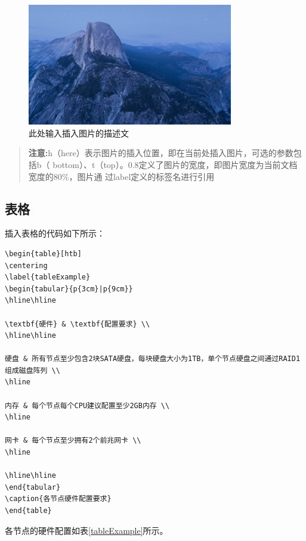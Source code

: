 \begin{figure}[h]
    \centering
    \label{example}
    \includegraphics[width=0.8\textwidth]{pic/example.png}
    \caption{此处输入插入图片的描述文}
\end{figure}

\begin{quote}
\kaishu
\textbf{注意:}h（here）表示图片的插入位置，即在当前处插入图片，可选的参数包括b（
bottom）、t（top）。0.8定义了图片的宽度，即图片宽度为当前文档宽度的80\%，图片通
过label定义的标签名进行引用
\end{quote}

\subsection{表格}
插入表格的代码如下所示：

\begin{Verbatim}[]
\begin{table}[htb]
\centering
\label{tableExample}
\begin{tabular}{p{3cm}|p{9cm}}
\hline\hline

\textbf{硬件} & \textbf{配置要求} \\
\hline\hline

硬盘 & 所有节点至少包含2块SATA硬盘，每块硬盘大小为1TB，单个节点硬盘之间通过RAID1组成磁盘阵列 \\
\hline

内存 & 每个节点每个CPU建议配置至少2GB内存 \\
\hline

网卡 & 每个节点至少拥有2个前兆网卡 \\
\hline

\hline\hline
\end{tabular}
\caption{各节点硬件配置要求}
\end{table}
\end{Verbatim}


各节点的硬件配置如表\ref{tableExample}所示。

